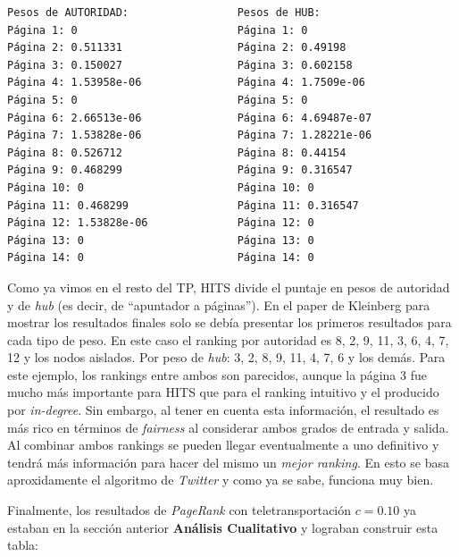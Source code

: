 \begin{verbatim}
Pesos de AUTORIDAD:	                Pesos de HUB:
Página 1: 0                         Página 1: 0
Página 2: 0.511331                  Página 2: 0.49198
Página 3: 0.150027                  Página 3: 0.602158
Página 4: 1.53958e-06               Página 4: 1.7509e-06
Página 5: 0                         Página 5: 0
Página 6: 2.66513e-06               Página 6: 4.69487e-07
Página 7: 1.53828e-06               Página 7: 1.28221e-06
Página 8: 0.526712                  Página 8: 0.44154
Página 9: 0.468299                  Página 9: 0.316547
Página 10: 0                        Página 10: 0
Página 11: 0.468299                 Página 11: 0.316547
Página 12: 1.53828e-06              Página 12: 0
Página 13: 0                        Página 13: 0
Página 14: 0                        Página 14: 0
\end{verbatim}

Como ya vimos en el resto del TP, HITS divide el puntaje en pesos de autoridad y de \textit{hub} (es decir, de ``apuntador a páginas''). En el paper de Kleinberg para mostrar los resultados finales solo se debía presentar los primeros resultados para cada tipo de peso. En este caso el ranking por autoridad es 8, 2, 9, 11, 3, 6, 4, 7, 12 y los nodos aislados. Por peso de \textit{hub}: 3, 2, 8, 9, 11, 4, 7, 6 y los demás. Para este ejemplo, los rankings entre ambos son parecidos, aunque la página 3 fue mucho más importante para HITS que para el ranking intuitivo y el producido por \textit{in-degree}. Sin embargo, al tener en cuenta esta información, el resultado es más rico en términos de \textit{fairness} al considerar ambos grados de entrada y salida. Al combinar ambos rankings se pueden llegar eventualmente a uno definitivo y tendrá más información para hacer del mismo un \textit{mejor ranking}. En esto se basa aproxidamente el algoritmo de \textit{Twitter} y como ya se sabe, funciona muy bien. 

Finalmente, los resultados de \textit{PageRank} con teletransportación $c = 0.10$ ya estaban en la sección anterior \textbf{Análisis Cualitativo} y lograban construir esta tabla:

